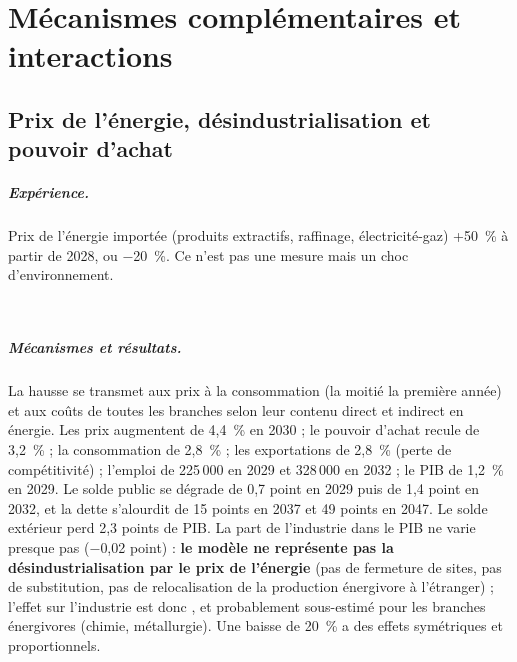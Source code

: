 \chapter{Mécanismes complémentaires et interactions}
\label{ch:complementaires}

\section{Prix de l'énergie, désindustrialisation et pouvoir d'achat}

\paragraph{Expérience.} Prix de l'énergie importée (produits extractifs, raffinage, électricité-gaz) +50~\% à partir de
2028, ou $-$20~\%. Ce n'est pas une mesure mais un choc d'environnement.

\begin{table}[htbp]
\centering\scriptsize
\caption{Chocs d'environnement et mesures complémentaires.}
\label{tab:complementaires}
\\[4pt]
\end{table}

\paragraph{Mécanismes et résultats.} La hausse se transmet aux prix à la consommation (la moitié la première année) et aux
coûts de toutes les branches selon leur contenu direct et indirect en énergie. Les prix augmentent de 4,4~\% en 2030 ;
le pouvoir d'achat recule de 3,2~\% ; la consommation de 2,8~\% ; les exportations de 2,8~\% (perte de compétitivité) ;
l'emploi de 225\,000 en 2029 et 328\,000 en 2032 ; le PIB de 1,2~\% en 2029. Le solde public se dégrade de 0,7 point en
2029 puis de 1,4 point en 2032, et la dette s'alourdit de 15 points en 2037 et 49 points en 2047. Le solde extérieur
perd 2,3 points de PIB. La part de l'industrie dans le PIB ne varie presque pas ($-$0,02 point) : \textbf{le modèle ne
représente pas la désindustrialisation par le prix de l'énergie} (pas de fermeture de sites, pas de substitution, pas
de relocalisation de la production énergivore à l'étranger) ; l'effet sur l'industrie est donc , et
probablement sous-estimé pour les branches énergivores (chimie, métallurgie). Une baisse de 20~\% a des effets
symétriques et proportionnels.

